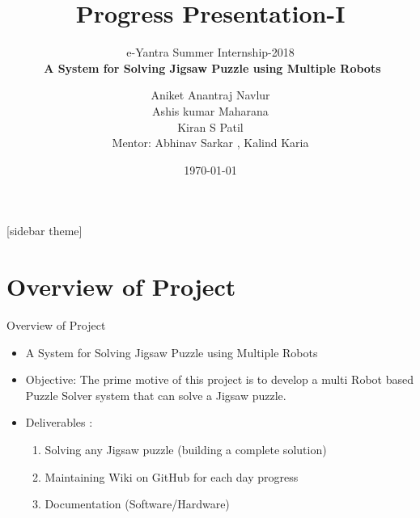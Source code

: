 \documentclass[10pt, a4paper]{beamer}
\begin{document}
	\title{Progress Presentation-I}
	\subtitle{e-Yantra Summer Internship-2018 \\ $ $\textbf{ A System for Solving Jigsaw Puzzle using Multiple Robots}$ $}
	\author{$ $Aniket Anantraj Navlur$ $\\$ $Ashis kumar Maharana$ $\\$ $Kiran S Patil$ $\\
	Mentor: $ $Abhinav Sarkar , Kalind Karia$ $}
	\date{\today}
	\frame{\titlepage}

[sidebar theme]
\section{Overview of Project}
\begin{frame}{Overview of Project}
	
	\begin{itemize}
		\item A System for Solving Jigsaw Puzzle using Multiple Robots\pause
		\item Objective: The prime motive of this project is to develop a multi Robot based Puzzle Solver system that can solve a Jigsaw puzzle.\pause
		\item Deliverables : \begin{enumerate}
		\item  Solving any Jigsaw puzzle (building a complete solution)\pause
		\item 	Maintaining Wiki on GitHub for each day progress\pause
		\item 	Documentation (Software/Hardware) 
		\end{enumerate}
	\end{itemize}
\end{frame}
\end{document}
